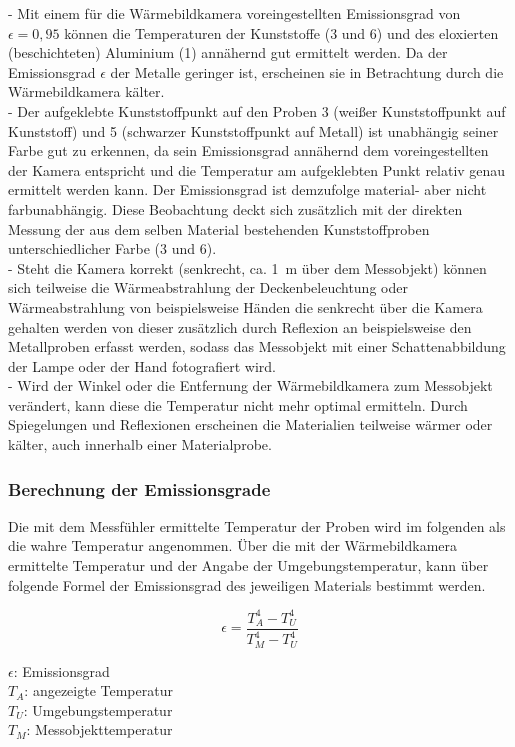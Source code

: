 - Mit einem für die Wärmebildkamera voreingestellten Emissionsgrad von $\epsilon=0,95$ können die Temperaturen der  Kunststoffe (3 und 6) und des eloxierten (beschichteten) Aluminium (1) annähernd gut ermittelt werden. Da der Emissionsgrad $\epsilon$ der Metalle geringer ist, erscheinen sie in Betrachtung durch die  Wärmebildkamera kälter. \\
- Der aufgeklebte Kunststoffpunkt auf den Proben 3 (weißer Kunststoffpunkt auf Kunststoff) und 5 (schwarzer Kunststoffpunkt auf Metall) ist unabhängig seiner Farbe gut zu erkennen, da sein Emissionsgrad annähernd dem voreingestellten der Kamera entspricht und die Temperatur am aufgeklebten Punkt relativ genau ermittelt werden kann. Der Emissionsgrad ist demzufolge material- aber nicht farbunabhängig. Diese Beobachtung deckt sich zusätzlich mit der direkten Messung der aus dem selben Material bestehenden Kunststoffproben unterschiedlicher Farbe (3 und 6). \\
-  Steht die Kamera korrekt (senkrecht, ca. \SI{1}{m} über dem Messobjekt) können sich teilweise die Wärmeabstrahlung der Deckenbeleuchtung oder Wärmeabstrahlung von beispielsweise Händen die senkrecht über die Kamera gehalten werden von dieser zusätzlich durch Reflexion an beispielsweise den Metallproben erfasst werden, sodass das Messobjekt mit einer Schattenabbildung der Lampe oder der Hand fotografiert wird. \\
- Wird der Winkel oder die Entfernung der Wärmebildkamera zum Messobjekt verändert, kann diese die Temperatur nicht mehr optimal ermitteln. Durch Spiegelungen und Reflexionen erscheinen die Materialien teilweise wärmer oder kälter, auch innerhalb einer Materialprobe. 


\subsubsection{Berechnung der Emissionsgrade}

Die mit dem Messfühler ermittelte Temperatur der Proben wird im folgenden als die wahre Temperatur angenommen. Über die mit der Wärmebildkamera ermittelte Temperatur und der Angabe der Umgebungstemperatur, kann über folgende Formel der Emissionsgrad des jeweiligen Materials bestimmt werden. 

\begin{equation}\label{epsilon}
\epsilon=\frac{T_A^4-T_U^4}{T_M^4-T_U^4}
\end{equation}

\begin{center}
	\begin{small}
		$\epsilon$: Emissionsgrad\\
		$T_A$: angezeigte Temperatur\\
		$T_U$: Umgebungstemperatur\\
		$T_M$: Messobjekttemperatur\\
	\end{small}
\end{center}

